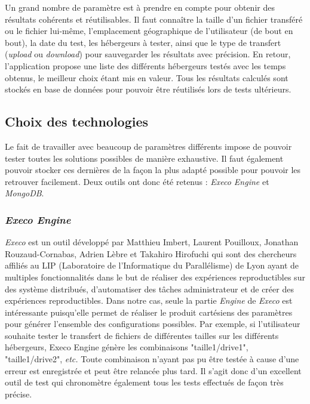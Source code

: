\documentclass[10pt]{article}
\begin{document}
Un grand nombre de paramètre est à prendre en compte pour obtenir des résultats
cohérents et réutilisables. Il faut connaître la taille d'un fichier transféré
ou le fichier lui-même, l'emplacement géographique de l'utilisateur (de bout en
bout), la date du test, les hébergeurs à tester, ainsi que le type de transfert
(\textit{upload} ou \textit{download}) pour sauvegarder les résultats avec
précision. En retour, l'application propose une liste des différents hébergeurs
testés avec les temps obtenus, le meilleur choix étant mis en valeur. Tous les
résultats calculés sont stockés en base de données pour pouvoir être réutilisés
lors de tests ultérieurs.

  
\subsection{Choix des technologies}

Le fait de travailler avec beaucoup de paramètres différents impose de pouvoir
tester toutes les solutions possibles de manière exhaustive. Il faut également
pouvoir stocker ces dernières de la façon la plus adapté possible pour pouvoir
les retrouver facilement. Deux outils ont donc été retenus : \textit{Execo
Engine} et \textit{MongoDB}.

\subsubsection{\textit{Execo Engine}}

\textit{Execo} est un outil développé par Matthieu Imbert, Laurent Pouilloux,
Jonathan Rouzaud-Cornabas, Adrien Lèbre et Takahiro Hirofuchi qui sont des
chercheurs affiliés au LIP (Laboratoire de l'Informatique du Parallélisme)  de
Lyon ayant de multiples fonctionnalités dans le but de réaliser des expériences
reproductibles sur des système distribués, d'automatiser des tâches
administrateur et de créer des expériences reproductibles. Dans notre cas,
seule la partie \textit{Engine} de \textit{Execo} est intéressante puisqu'elle
permet de réaliser le produit cartésiens des paramètres pour générer l'ensemble
des configurations possibles. Par exemple, si l'utilisateur souhaite tester le
transfert de fichiers de différentes tailles sur les différents hébergeurs,
Execo Engine génère les combinaisons "taille1/drive1", "taille1/drive2",
\textit{etc.} Toute combinaison n'ayant pas pu être testée à cause d'une erreur
est enregistrée et peut être relancée plus tard. Il s'agit donc d'un excellent
outil de test qui chronomètre également tous les tests effectués de façon très
précise.
\end{document}

